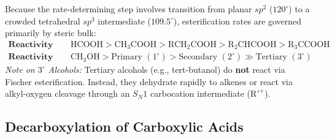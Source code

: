 \documentclass[10pt,a4paper]{article}
\begin{document}
\begin{usecasebox}
Because the rate-determining step involves transition from planar $sp^2$ ($120^\circ$) to a crowded tetrahedral $sp^3$ intermediate ($109.5^\circ$), esterification rates are governed primarily by steric bulk:
\begin{align*}
  \textbf{Reactivity of Carboxylic Acids:} \quad & \mathrm{HCOOH} > \mathrm{CH_3COOH} > \mathrm{RCH_2COOH} > \mathrm{R_2CHCOOH} > \mathrm{R_3CCOOH}\\
  \textbf{Reactivity of Alcohols:} \quad & \mathrm{CH_3OH} > \text{Primary } (1^\circ) > \text{Secondary } (2^\circ) \gg \text{Tertiary } (3^\circ)
\end{align*}
\textit{Note on $3^\circ$ Alcohols:} Tertiary alcohols (e.g., tert-butanol) do \textbf{not} react via Fischer esterification. Instead, they dehydrate rapidly to alkenes or react via alkyl-oxygen cleavage through an $S_N1$ carbocation intermediate ($\mathrm{R'}^+$).
\end{usecasebox}

\subsection{Decarboxylation of Carboxylic Acids}
\end{document}

